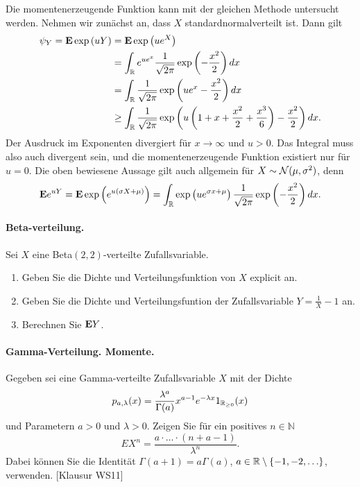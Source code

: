 Die momentenerzeugende Funktion kann mit der gleichen Methode untersucht werden. 
Nehmen wir zunächst an, dass $X$ standardnormalverteilt ist. Dann gilt
\begin{align*}
    \psi_Y = \mathbf{E} \exp \left( uY \right) &= \mathbf{E} \exp \left( u e^{X} \right) \\
    &= \int_{\mathbb R} e^{u e^{x}} \frac{1}{\sqrt{ 2 \pi}} \exp \left(  - \frac{x^2}{2}  \right) dx \\
    &= \int_{\mathbb R} \frac{1}{\sqrt{2 \pi}} \exp \left(u e^{x} - \frac{x^2}{2} \right)dx \\
    & \geq \int_{\mathbb R}^{} \frac{1}{\sqrt{2\pi}} 
    \exp \left( u\left(1 + x + \frac{x^2}{2} + \frac{x^3}{6}\right) - \frac{x^2}{2} \right) dx.
\end{align*}
Der Ausdruck im Exponenten divergiert für $x\to \infty$ und $u>0$. Das Integral muss 
also auch divergent sein, und die momentenerzeugende Funktion existiert nur für $u=0$. 
Die oben bewiesene Aussage gilt auch allgemein für $X \sim \mathcal N (\mu, \sigma^2)$, denn
\begin{equation*}
    \mathbf{E} e^{uY} = \mathbf{E} \exp \left( e^{u (\sigma X + \mu)} \right) = 
    \int_{\mathbb R} \exp \left( u e^{\sigma x + \mu} \right) \frac{1}{\sqrt{2\pi}}
    \exp \left( -\frac{x^2}{2} \right) dx. 
\end{equation*}



\paragraph{Beta-verteilung.} Sei $X$ eine Beta$(2,2)$-verteilte Zufallsvariable.
\begin{enumerate}
    \item Geben Sie die Dichte und Verteilungsfunktion von $X$ explicit an. 
    \item Geben Sie die Dichte und Verteilungsfuntion der Zufallsvariable
        $Y = \frac{1}{X} - 1$ an. 
    \item Berechnen Sie $\mathbf{E} Y$.  
\end{enumerate}


\paragraph{Gamma-Verteilung. Momente.}
Gegeben sei eine Gamma-verteilte Zufallsvariable $X$ mit der Dichte
\begin{equation*}
    p_{a,\lambda}(x) = \frac{\lambda^a}{\Gamma(a)}x^{a-1}e^{-\lambda x} 1_{\mathbb R_{\geq 0}}(x)
\end{equation*}
und Parametern $a>0$ und $\lambda>0$.
Zeigen Sie für ein positives $n\in\mathbb N$
\begin{equation*}
    E X^n = \frac{a\cdot\ldots\cdot (n+a-1)}{\lambda^n}.
\end{equation*}
Dabei können Sie die Identität 
$\Gamma(a+1)=a \Gamma(a)$, $a\in\mathbb R \setminus \left\{ -1,-2,\ldots \right\}$, verwenden.
[Klausur WS11]


